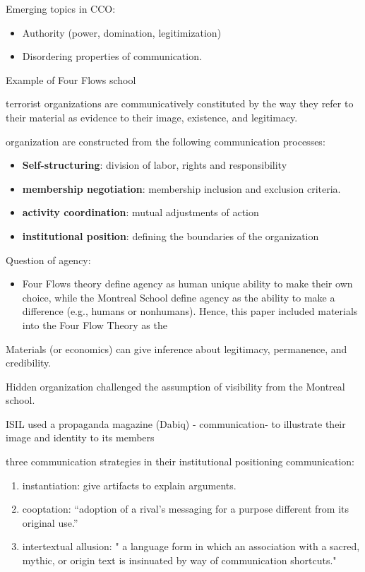 \documentclass[
]{book}
\providecommand{\tightlist}{%
  \setlength{\itemsep}{0pt}\setlength{\parskip}{0pt}}
\begin{document}
Emerging topics in CCO:

\begin{itemize}
\tightlist
\item
  Authority (power, domination, legitimization)
\item
  Disordering properties of communication.
\end{itemize}

\citep{Bruscella_2018}

Example of Four Flows school

terrorist organizations are communicatively constituted by the way they refer to their material as evidence to their
image, existence, and legitimacy.

organization are constructed from the following communication processes:

\begin{itemize}
\tightlist
\item
  \textbf{Self-structuring}: division of labor, rights and responsibility
\item
  \textbf{membership negotiation}: membership inclusion and exclusion criteria.
\item
  \textbf{activity coordination}: mutual adjustments of action
\item
  \textbf{institutional position}: defining the boundaries of the organization
\end{itemize}

Question of agency:

\begin{itemize}
\tightlist
\item
  Four Flows theory define agency as human unique ability to make their own choice, while the Montreal School define
  agency as the ability to make a difference (e.g., humans or nonhumans). Hence, this paper included materials into
  the Four Flow Theory as the
\end{itemize}

Materials (or economics) can give inference about legitimacy, permanence, and credibility.

Hidden organization challenged the assumption of visibility from the Montreal school.

ISIL used a propaganda magazine (Dabiq) - communication- to illustrate their image and identity to its members

three communication strategies in their institutional positioning communication:

\begin{enumerate}
\def\labelenumi{(\arabic{enumi})}
\tightlist
\item
  instantiation: give artifacts to explain arguments.
\item
  cooptation: ``adoption of a rival's messaging for a purpose different from its original use.''
\item
  intertextual allusion: " a language form in which an association with a sacred, mythic, or origin text is insinuated
  by way of communication shortcuts."
\end{enumerate}
\end{document}
